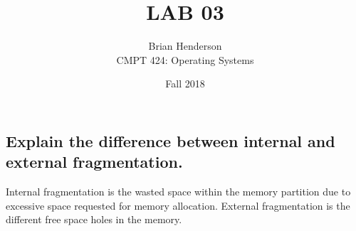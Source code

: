\documentclass[12pt]{article}
\begin{document}
   \date{Fall 2018}
    
   \title{LAB 03	}
   \author{Brian Henderson \\ 
         CMPT 424: Operating Systems}
   \maketitle
   
   \subsection*{Explain the difference between internal and external fragmentation.}
   
   Internal fragmentation is the wasted space within the memory partition due to excessive space requested for memory allocation. External fragmentation is the different free space holes in the memory.
   
\end{document}
